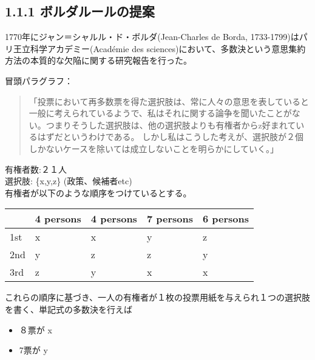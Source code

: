 \documentclass{article}
\begin{document}
\subsection{1.1.1 ボルダルールの提案}
\label{sec:org9f662a9}
1770年にジャン＝シャルル・ド・ボルダ(Jean-Charles de Borda, 1733-1799)はパリ王立科学アカデミー(Académie des sciences)において、多数決という意思集約方法の本質的な欠陥に関する研究報告を行った。

冒頭パラグラフ：
\begin{quote}
「投票において再多数票を得た選択肢は、常に人々の意思を表していると一般に考えられているようで、私はそれに関する論争を聞いたことがない。つまりそうした選択肢は、他の選択肢よりも有権者からz好まれているはずだというわけである。
しかし私はこうした考えが、選択肢が２個しかないケースを除いては成立しないことを明らかにしていく。」
\end{quote}
有権者数:２１人 \\
選択肢: \{x,y,z\} (政策、候補者etc) \\
有権者が以下のような順序をつけているとする。\\

\begin{center}
\begin{tabular}{lllll}
 & 4 persons & 4 persons & 7 persons & 6 persons\\
\hline
1st & x & x & y & z\\
2nd & y & z & z & y\\
3rd & z & y & x & x\\
\end{tabular}
\end{center}


これらの順序に基づき、一人の有権者が１枚の投票用紙を与えられ１つの選択肢を書く、単記式の多数決を行えば

\begin{itemize}
\item ８票が x
\item 7票が y
\end{itemize}
\end{document}
